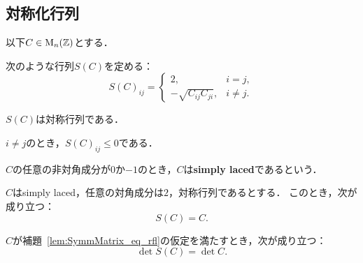 \subsection{対称化行列}

以下$C \in \operatorname{M}_n(\mathbb{Z})$とする．

\begin{definition}
  \label{def:SymmMatrix}
  \leanok
  次のような行列$S(C)$を定める：
  \begin{equation}
    S(C)_{ij} = \begin{cases}
      2, & i = j, \\
      -\sqrt{C_{ij} C_{ji}}, & i \ne j.
    \end{cases}
  \end{equation}
\end{definition}

\begin{lemma}
  \label{lem:SymmMatrix_isSymm}
  \leanok
  \uses{}
  $S(C)$は対称行列である．
\end{lemma}

\begin{lemma}
  \label{lem:symmMatrix_off_diag_nonpos}
  \leanok
  \uses{}
  $i \ne j$のとき，$S(C)_{ij} \le 0$である．
\end{lemma}

\begin{definition}
  \label{def:Matrix.IsSimplyLaced}
  \leanok
  $C$の任意の非対角成分が$0$か$-1$のとき，$C$は\textbf{simply laced}であるという．
\end{definition}

\begin{lemma}
  \label{lem:SymmMatrix_eq_rfl}
  \leanok
  $C$はsimply laced，任意の対角成分は$2$，対称行列であるとする．
  このとき，次が成り立つ：
  \begin{equation}
    S(C) = C.
  \end{equation}
\end{lemma}

\begin{lemma}
  \label{lem:det_SymmMatrix_eq_rfl}
  \leanok
  $C$が補題~\ref{lem:SymmMatrix_eq_rfl}の仮定を満たすとき，次が成り立つ：
  \begin{equation}
    \det S(C) = \det C.
  \end{equation}
\end{lemma}

